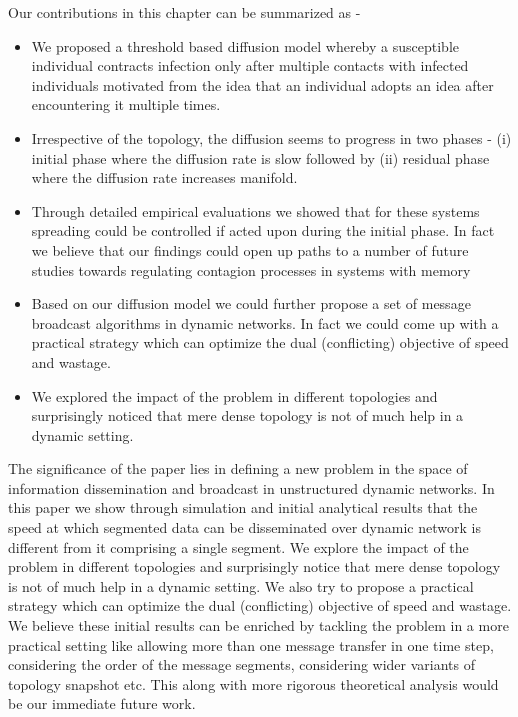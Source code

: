 \noindent
Our contributions in this chapter can be summarized as - 
\begin{itemize}
 \item We proposed a threshold based diffusion model whereby a susceptible individual contracts infection only after multiple contacts with infected individuals motivated 
 from the idea that an individual adopts an idea after encountering it multiple times.
 \item Irrespective of the topology, the diffusion seems to progress in two phases - (i) initial phase where the diffusion rate is slow followed by (ii) residual phase where 
 the diffusion rate increases manifold.
 \item Through detailed empirical evaluations we showed that for these systems spreading could be controlled if acted upon during the initial phase. In fact  
 we believe that our findings could open up paths to a number of future studies towards regulating contagion processes in systems with memory
 \item Based on our diffusion model we could further propose a set of message broadcast algorithms in dynamic networks. In fact we could come up with a practical strategy which 
can optimize the dual (conflicting) objective of speed and wastage. 
 \item We explored the impact of the problem in different topologies and surprisingly noticed that mere dense 
topology is not of much help in a dynamic setting.
\end{itemize}


The significance of the paper lies in  defining a new problem in the space of information dissemination and broadcast in unstructured dynamic networks. 
In this paper we show through simulation and initial analytical results that
 the speed at which segmented data can be disseminated 
over dynamic network is different from it comprising a single segment. 
We explore the impact of the problem in different topologies and surprisingly notice that mere dense 
topology is not of much help in a dynamic setting. We also try to propose a practical strategy which 
can optimize the dual (conflicting) objective of speed and wastage. 
We believe these initial results can be enriched by  tackling the problem in a more practical setting 
like allowing more than one message transfer in one time step, considering the order of the 
message segments, considering wider variants of topology snapshot etc. 
This along with more rigorous theoretical analysis would be our immediate future work. 

